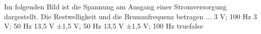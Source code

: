     {Im folgenden Bild ist die Spannung am Ausgang einer Stromversorgung dargestellt. Die Restwelligkeit und die Brummfrequenz betragen ...}
    {3 V; 100 Hz}
    {3 V; 50 Hz}
    {13,5 V ±1,5 V; 50 Hz}
    {13,5 V ±1,5 V; 100 Hz}
    {true}{false}